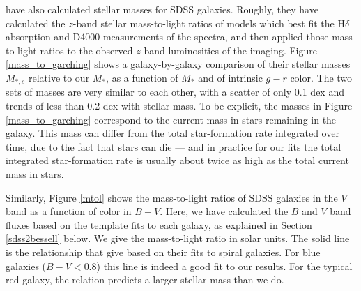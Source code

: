 \documentclass[12pt,preprint]{aastex}
\begin{document}
\citet{kauffmann03a} have also calculated stellar masses for SDSS
galaxies. Roughly, they have calculated the $z$-band stellar
mass-to-light ratios of models which best fit the H$\delta$ absorption
and D4000 measurements of the spectra, and then applied those
mass-to-light ratios to the observed $z$-band luminosities of the
imaging. Figure \ref{mass_to_garching} shows a galaxy-by-galaxy
comparison of their stellar masses $M_{\ast,s}$ relative to our
$M_\ast$, as a function of $M_\ast$ and of intrinsic $g-r$ color. The
two sets of masses are very similar to each other, with a scatter of
only 0.1 dex and trends of less than 0.2 dex with stellar mass.  To be
explicit, the masses in Figure \ref{mass_to_garching} correspond to
the current mass in stars remaining in the galaxy. This mass can
differ from the total star-formation rate integrated over time, due to
the fact that stars can die --- and in practice for our fits the total
integrated star-formation rate is usually about twice as high as the
total current mass in stars.

Similarly, Figure \ref{mtol} shows the mass-to-light ratios of SDSS
galaxies in the $V$ band as a function of color in $B-V$. Here, we
have calculated the $B$ and $V$ band fluxes based on the template fits
to each galaxy, as explained in Section \ref{sdss2bessell} below. We
give the mass-to-light ratio in solar units. The solid line is the
relationship that \citet{bell01b} give based on their fits to spiral
galaxies. For blue galaxies ($B-V < 0.8$) this line is indeed a good
fit to our results. For the typical red galaxy, the \citet{bell01b}
relation predicts a larger stellar mass than we do. 
\end{document}
